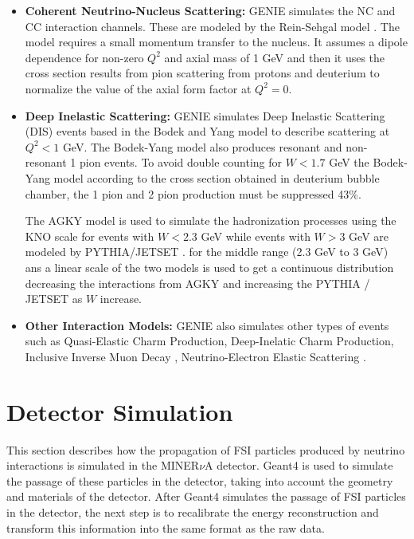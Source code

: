 \begin{itemize}
    \item \textbf{Coherent Neutrino-Nucleus Scattering:} GENIE simulates the NC and CC interaction channels. These are modeled by the Rein-Sehgal model \cite{REINcoh198329}. The model requires a small momentum transfer to the nucleus. It assumes a dipole dependence for non-zero $Q^2$ and axial mass of 1 GeV and then it uses the cross section results from pion scattering from protons and deuterium to normalize the value of the axial form factor at $Q^2=0$. 
    \item \textbf{Deep Inelastic Scattering:} GENIE simulates Deep Inelastic Scattering (DIS) events based in the Bodek and Yang model \cite{Bodek_2003} to describe scattering at $Q^2<1$ GeV. The Bodek-Yang model also produces resonant and non-resonant 1 pion events. To avoid double counting for $W<1.7$ GeV the Bodek-Yang model according to the cross section obtained in deuterium bubble chamber, the 1 pion and 2 pion production must be suppressed 43\%\cite{Rodrigues_2016}. 

    The AGKY model \cite{Yang_2009}is used to simulate the hadronization processes using the KNO \cite{KOBA1972317} scale for events with $W<2.3$ GeV while events with $W>3$ GeV are modeled by PYTHIA/JETSET \cite{PHYTIASJOSTRAND2001238}. for the middle range (2.3 GeV to 3 GeV) ans a linear scale of the two models is used to get a continuous distribution decreasing the interactions from AGKY and increasing the PYTHIA / JETSET as $W$ increase. 
    \item \textbf{Other Interaction Models:} GENIE also simulates other types of events such as Quasi-Elastic Charm Production\cite{CharmProd}, Deep-Inelatic Charm Production\cite{PhysRevD.50.3085}, Inclusive Inverse Muon Decay \cite{BARDIN1987839}, Neutrino-Electron Elastic Scattering \cite{William}.
    
\end{itemize}

\section{Detector Simulation}
\label{Cap:Simulation:DetectorSimulation}

This section describes how the propagation of FSI particles produced by neutrino interactions is simulated in the MINER$\nu$A detector. Geant4 \cite{GEANT4} is used to simulate the passage of these particles in the detector, taking into account the geometry and materials of the detector. After Geant4 simulates the passage of FSI particles in the detector, the next step is to recalibrate the energy reconstruction and transform this information into the same format as the raw data. 

